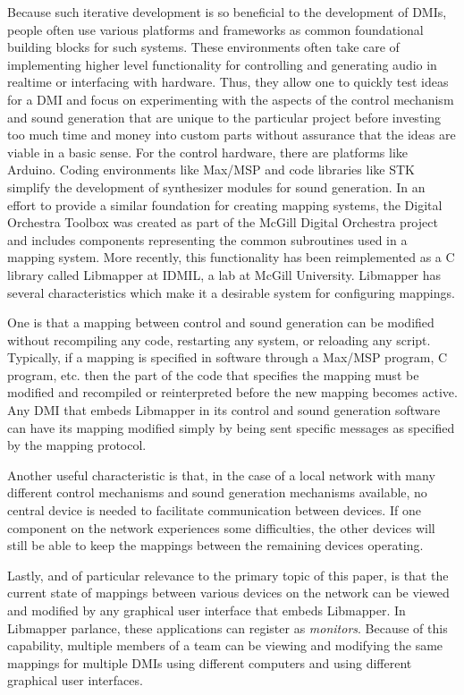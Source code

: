 Because such iterative development is so beneficial to the development of DMIs, people often use various platforms and frameworks as common foundational building blocks for such systems. These environments often take care of implementing higher level functionality for controlling and generating audio in realtime or interfacing with hardware. Thus, they allow one to quickly test ideas for a DMI and focus on experimenting with the aspects of the control mechanism and sound generation that are unique to the particular project before investing too much time and money into custom parts without assurance that the ideas are viable in a basic sense. For the control hardware, there are platforms like Arduino. Coding environments like Max/MSP and code libraries like STK simplify the development of synthesizer modules for sound generation. In an effort to provide a similar foundation for creating mapping systems, the Digital Orchestra Toolbox was created as part of the McGill Digital Orchestra project and includes components representing the common subroutines used in a mapping system. More recently, this functionality has been reimplemented as a C library called Libmapper at IDMIL, a lab at McGill University. Libmapper has several characteristics which make it a desirable system for configuring mappings. 

One is that a mapping between control and sound generation can be modified without recompiling any code, restarting any system, or reloading any script. Typically, if a mapping is specified in software through a Max/MSP program, C program, etc. then the part of the code that specifies the mapping must be modified and recompiled or reinterpreted before the new mapping becomes active. Any DMI that embeds Libmapper in its control and sound generation software can have its mapping modified simply by being sent specific messages as specified by the mapping protocol. 

Another useful characteristic is that, in the case of a local network with many different control mechanisms and sound generation mechanisms available, no central device is needed to facilitate communication between devices. If one component on the network experiences some difficulties, the other devices will still be able to keep the mappings between the remaining devices operating.  

Lastly, and of particular relevance to the primary topic of this paper, is that the current state of mappings between various devices on the network can be viewed and modified by any graphical user interface that embeds Libmapper. In Libmapper parlance, these applications can register as \emph{monitors}. Because of this capability, multiple members of a team can be viewing and modifying the same mappings for multiple DMIs using different computers and using different graphical user interfaces.  

